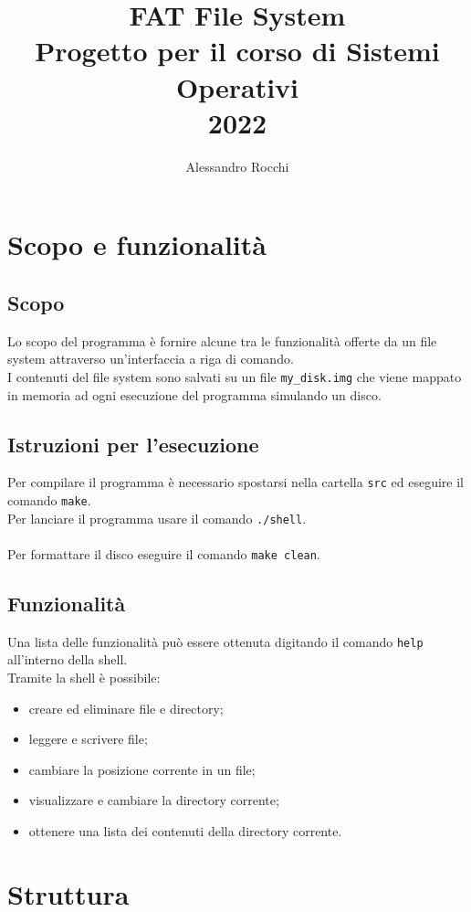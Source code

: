 \documentclass[12pt,a4paper,titlepage]{report}
\title{\textbf{FAT File System}\\Progetto per il corso di Sistemi Operativi\\2022}
\author{Alessandro Rocchi}
\date{}
\begin{document}
	\maketitle
	\chapter{Scopo e funzionalità}
	\section{Scopo}
	Lo scopo del programma è fornire alcune tra le funzionalità offerte da un file system attraverso un'interfaccia a riga di comando.\\
	I contenuti del file system sono salvati su un file \verb|my_disk.img| che viene mappato in memoria ad ogni esecuzione del programma simulando un disco.\\
	
	\section{Istruzioni per l'esecuzione}
	Per compilare il programma è necessario spostarsi nella cartella \verb|src| ed eseguire il comando \verb|make|.\\
	Per lanciare il programma usare il comando \verb|./shell|.\\\\
	Per formattare il disco eseguire il comando \verb|make clean|.\\
	
	\section{Funzionalità}
	Una lista delle funzionalità può essere ottenuta digitando il comando \verb|help| all'interno della shell.\\
	Tramite la shell è possibile:
	\begin{itemize}
		\item creare ed eliminare file e directory;
		\item leggere e scrivere file;
		\item cambiare la posizione corrente in un file;
		\item visualizzare e cambiare la directory corrente;
		\item ottenere una lista dei contenuti della directory corrente.
	\end{itemize}
	
	\chapter{Struttura}
	
\end{document}
